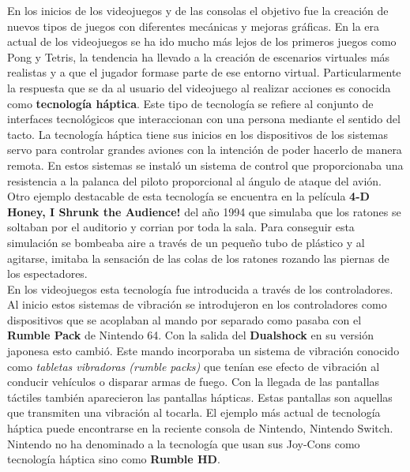 En los inicios de los videojuegos y de las consolas el objetivo fue la creaci\'on de nuevos tipos de juegos con diferentes mec\'anicas y mejoras gr\'aficas. En la era actual de los videojuegos se ha ido mucho m\'as lejos de los primeros juegos como Pong y Tetris, la tendencia ha llevado a la creaci\'on de escenarios virtuales m\'as realistas y a que el jugador formase parte de ese entorno virtual. Particularmente la respuesta que se da al usuario del videojuego al realizar acciones es conocida como \textbf{tecnolog\'ia h\'aptica}. Este tipo de tecnolog\'ia se refiere al conjunto de interfaces tecnol\'ogicos que interaccionan con una persona mediante el sentido del tacto. La tecnolog\'ia h\'aptica tiene sus inicios en los dispositivos de los sistemas servo para controlar grandes aviones con la intenci\'on de poder hacerlo de manera remota. En estos sistemas se instal\'o un sistema de control que proporcionaba una resistencia a la palanca del piloto proporcional al \'angulo de ataque del avi\'on. Otro ejemplo destacable de esta tecnolog\'ia se encuentra en la pel\'icula \textbf{4-D Honey, I Shrunk the Audience!} del a\~no 1994 que simulaba que los ratones se soltaban por el auditorio y corrian por toda la sala. Para conseguir esta simulaci\'on se bombeaba aire a trav\'es de un peque\~no tubo de pl\'astico y al agitarse, imitaba la sensaci\'on de las colas de los ratones rozando las piernas de los espectadores. \\

En los videojuegos esta tecnolog\'ia fue introducida a trav\'es de los controladores. Al inicio estos sistemas de vibraci\'on se introdujeron en los controladores como dispositivos que se acoplaban al mando por separado como pasaba con el \textbf{Rumble Pack} de Nintendo 64. Con la salida del \textbf{Dualshock} en su versi\'on japonesa esto cambi\'o. Este mando incorporaba un sistema de vibraci\'on conocido como \textit{tabletas vibradoras (rumble packs)} que ten\'ian ese efecto de vibraci\'on al conducir veh\'iculos o disparar armas de fuego. Con la llegada de las pantallas t\'actiles tambi\'en aparecieron las pantallas h\'apticas. Estas pantallas son aquellas que transmiten una vibraci\'on al tocarla. El ejemplo m\'as actual de tecnolog\'ia h\'aptica puede encontrarse en la reciente consola de Nintendo, Nintendo Switch. Nintendo no ha denominado a la tecnolog\'ia que usan sus Joy-Cons como tecnolog\'ia h\'aptica sino como \textbf{Rumble HD}. \\

